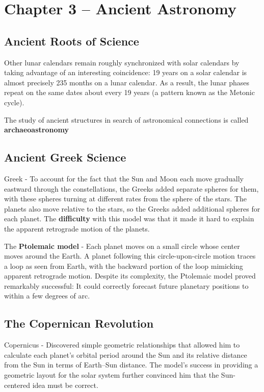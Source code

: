 \section{Chapter 3 -- Ancient Astronomy}
\subsection{Ancient Roots of Science}
Other lunar calendars remain roughly synchronized with solar calendars by taking advantage of an interesting coincidence: 19 years on a solar calendar is almost precisely 235 months on a lunar calendar. As a result, the lunar phases repeat on the same dates about every 19 years (a pattern known as the Metonic cycle).

The study of ancient structures in search of astronomical connections is called {\bf archaeoastronomy}

\subsection{Ancient Greek Science}
Greek - To account for the fact that the Sun and Moon each move gradually eastward through the constellations, the Greeks added separate spheres for them, with these spheres turning at different rates from the sphere of the stars. The planets also move relative to the stars, so the Greeks added additional spheres for each planet. The {\bf difficulty} with this model was that it made it hard to explain the apparent retrograde motion of the planets.

The {\bf Ptolemaic model} - Each planet moves on a small circle whose center moves around the Earth. A planet following this circle-upon-circle motion traces a loop as seen from Earth, with the backward portion of the loop mimicking apparent retrograde motion. Despite its complexity, the Ptolemaic model proved remarkably successful: It could correctly forecast future planetary positions to within a few degrees of arc.

\subsection{The Copernican Revolution}
Copernicus - Discovered simple geometric relationships that allowed him to calculate each planet’s orbital period around the Sun and its relative distance from the Sun in terms of Earth–Sun distance. The model’s success in providing a geometric layout for the solar system further convinced him that the Sun-centered idea must be correct.

